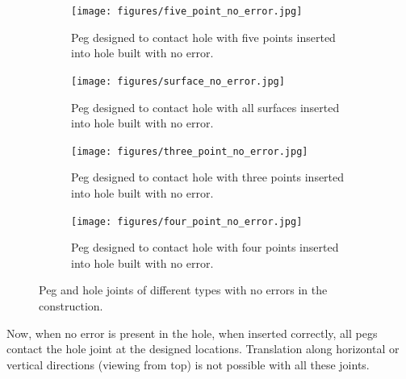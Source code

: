 \documentclass[11pt, twocolumn]{article}
\begin{document}
\begin{figure}
\begin{center}
\begin{subfigure}[t]{0.24\textwidth}
\begin{center}
\texttt{[image: figures/five\_point\_no\_error.jpg]}
\end{center}
\label{fig:five_point_no_error}
\caption{Peg designed to contact hole with five points inserted into hole built with no error. }
\end{subfigure}
\begin{subfigure}[t]{0.24\textwidth}
\begin{center}
\texttt{[image: figures/surface\_no\_error.jpg]}
\end{center}
\label{fig:surface_point_no_error}
\caption{Peg designed to contact hole with all surfaces inserted into hole built with no error. }
\end{subfigure}
\begin{subfigure}[t]{0.24\textwidth}
\begin{center}
\texttt{[image: figures/three\_point\_no\_error.jpg]}
\end{center}
\label{fig:three_point_no_error}
\caption{Peg designed to contact hole with three points inserted into hole built with no error. }
\end{subfigure}
\begin{subfigure}[t]{0.24\textwidth}
\begin{center}
\texttt{[image: figures/four\_point\_no\_error.jpg]}
\end{center}
\label{fig:four_point_no_error}
\caption{Peg designed to contact hole with four points inserted into hole built with no error. }
\end{subfigure}
\end{center}
\label{fig:no_error}
\caption{Peg and hole joints of different types with no errors in the construction. }
\end{figure}

Now, when no error is present in the hole, when inserted correctly, all pegs contact the hole joint at the designed locations. Translation along horizontal or vertical directions (viewing from top) is not possible with all these joints. 
\end{document}
